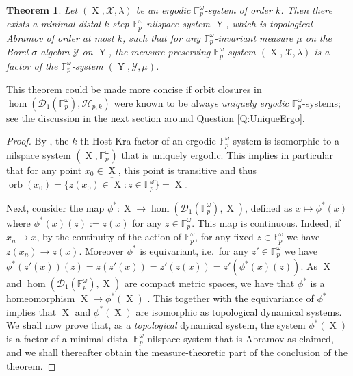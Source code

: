 \documentclass[a4paper,12pt,reqno]{amsart}
\newtheorem{theorem}{Theorem}[section]
\theoremstyle{definition}
\newcommand{\mc}{\mathcal}
\newcommand{\mb}{\mathbb}
\DeclareMathOperator{\ns}{X}
\DeclareMathOperator{\nss}{Y}
\DeclareMathOperator{\orb}{orb}
\begin{document}
\begin{theorem}\label{thm:main}
Let $(\ns,\mc{X},\lambda)$ be an ergodic $\mb{F}_p^\omega$-system of order $k$. Then there exists a minimal distal $k$-step $\mb{F}_p^\omega$-nilspace system $\nss$, which is topological Abramov of order at most $k$, such that for any $\mb{F}_p^\omega$-invariant measure $\mu$ on the Borel $\sigma$-algebra $\mc{Y}$ on $\nss$, the measure-preserving $\mb{F}_p^\omega$-system $(\ns,\mc{X},\lambda)$ is a factor of the $\mb{F}_p^\omega$-system $(\nss,\mc{Y},\mu)$.
\end{theorem}
\noindent This theorem could be made more concise if orbit closures in $\hom(\mc{D}_1(\mb{F}_p^\omega),\mc{H}_{p,k})$ were known to be always \emph{uniquely ergodic} $\mb{F}_p^\omega$-systems; see the discussion in the next section around Question \ref{Q:UniqueErgo}.
\begin{proof}
By \cite[Theorem 5.3]{CGSS-p-hom}, the $k$-th Host-Kra factor of an ergodic $\mb{F}_p^\omega$-system is isomorphic to a nilspace system $(\ns,\mb{F}_p^\omega)$ that is uniquely ergodic. This implies in particular that for any point $x_0\in \ns$, this point is transitive and thus $\overline{\orb(x_0)}=\overline{\{z(x_0)\in\ns: z\in \mb{F}_p^\omega\}}=\ns$.

Next, consider the map $\phi^*:
\ns \to  \hom(\mc{D}_1(\mb{F}_p^\omega),\ns)$, 
defined as $x \mapsto \phi^*(x)$ where $\phi^*(x)(z):=z(x)$ for any $z\in \mb{F}_p^\omega$. This map is continuous. Indeed, if $x_n\to x$, by the continuity of the action of $\mb{F}_p^\omega$, for any fixed $z\in \mb{F}_p^\omega$ we have $z(x_n)\to z(x)$. Moreover $\phi^*$ is equivariant, i.e.\ for any $z'\in \mb{F}_p^\omega$ we have $\phi^*(z'(x))(z)=z(z'(x)) = z'(z(x)) = z'(\phi^*(x)(z))$. As $\ns$ and $\hom(\mc{D}_1(\mb{F}_p^\omega),\ns)$ are compact metric spaces, we have that $\phi^*$ is a homeomorphism $\ns\to \phi^*(\ns)$ \cite[Theorem 26.6]{Munkres}. This together with the equivariance of $\phi^*$ implies that  $\ns$ and $\phi^*(\ns)$ are isomorphic as topological dynamical systems. We shall now prove that, as a \emph{topological} dynamical system, the system $\phi^*(\ns)$ is a factor of a minimal distal $\mb{F}_p^\omega$-nilspace system that is Abramov as claimed, and we shall thereafter obtain the measure-theoretic part of the conclusion of the theorem.


\end{proof}
\end{document}
